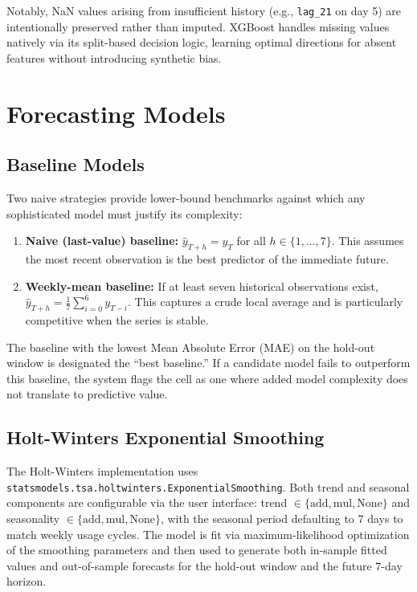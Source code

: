 Notably, NaN values arising from insufficient history (e.g., \texttt{lag\_21} on day 5) are intentionally preserved rather than imputed. XGBoost handles missing values natively via its split-based decision logic, learning optimal directions for absent features without introducing synthetic bias.


\section{Forecasting Models}
\label{sec:forecasting_models}

\subsection{Baseline Models}

Two naive strategies provide lower-bound benchmarks against which any sophisticated model must justify its complexity:

\begin{enumerate}
    \item \textbf{Naive (last-value) baseline:} $\hat{y}_{T+h} = y_T$ for all $h \in \{1,\ldots,7\}$. This assumes the most recent observation is the best predictor of the immediate future.
    \item \textbf{Weekly-mean baseline:} If at least seven historical observations exist, $\hat{y}_{T+h} = \frac{1}{7}\sum_{i=0}^{6} y_{T-i}$. This captures a crude local average and is particularly competitive when the series is stable.
\end{enumerate}

The baseline with the lowest Mean Absolute Error (MAE) on the hold-out window is designated the ``best baseline.'' If a candidate model fails to outperform this baseline, the system flags the cell as one where added model complexity does not translate to predictive value.

\subsection{Holt-Winters Exponential Smoothing}

The Holt-Winters implementation uses \texttt{statsmodels.tsa.holtwinters.ExponentialSmoothing}. Both trend and seasonal components are configurable via the user interface: trend $\in \{\text{add}, \text{mul}, \text{None}\}$ and seasonality $\in \{\text{add}, \text{mul}, \text{None}\}$, with the seasonal period defaulting to 7 days to match weekly usage cycles. The model is fit via maximum-likelihood optimization of the smoothing parameters and then used to generate both in-sample fitted values and out-of-sample forecasts for the hold-out window and the future 7-day horizon.

